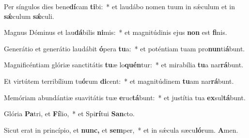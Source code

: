 \item Per síngulos dies bene\textbf{dí}cam \textbf{ti}bi:~* et laudábo nomen tuum in sǽculum et in \textbf{sǽ}culum \textbf{sǽ}culi.
\item Magnus Dóminus et lau\textbf{dá}bilis \textbf{ni}mis:~* et magnitúdinis ejus \textbf{non} est \textbf{fi}nis.
\item Generátio et generátio laudábit \textbf{ó}pera \textbf{tu}a:~* et poténtiam tuam pro\textbf{nun}ti\textbf{á}bunt.
\item Magnificéntiam glóriæ sanctitátis \textbf{tu}æ lo\textbf{quén}tur:~* et mirabília \textbf{tu}a nar\textbf{rá}bunt.
\item Et virtútem terribílium tu\textbf{ó}rum \textbf{di}cent:~* et magnitúdinem \textbf{tu}am nar\textbf{rá}bunt.
\item Memóriam abundántiæ suavitátis tuæ \textbf{e}ruc\textbf{tá}bunt:~* et justítia tua \textbf{ex}sul\textbf{tá}bunt.
\item Glória \textbf{Pa}tri, et \textbf{Fí}lio,~* et Spi\textbf{rí}tui \textbf{San}cto.
\item Sicut erat in princípio, et \textbf{nunc,} et \textbf{sem}per,~* et in sǽcula sæcu\textbf{ló}rum. \textbf{A}men.
